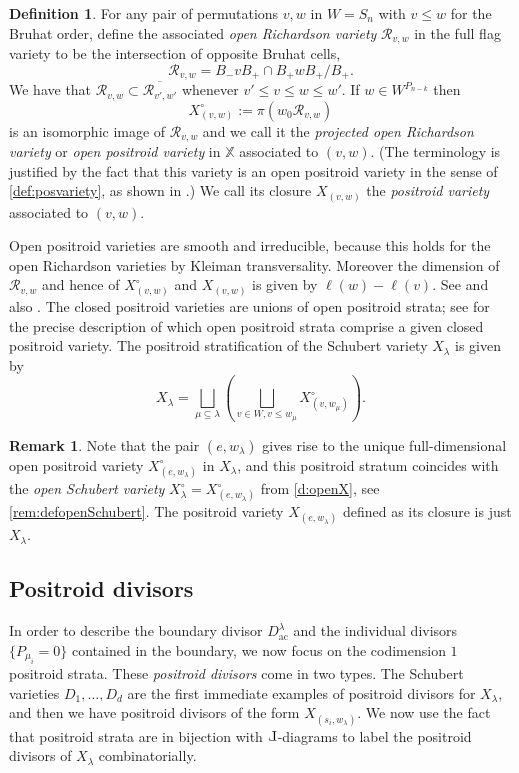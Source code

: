 \documentclass{amsart}
\def\Le{\hbox{\rotatebox[origin=c]{180}{$\Gamma$}}}
\theoremstyle{definition}
\newtheorem{defn}[thm]{Definition}
\newtheorem{remark}[thm]{Remark}
\numberwithin{equation}{section}
\newcommand{\openSchub}{{X_{\lambda}^{\circ}}}
\newcommand{\ac}{\operatorname{ac}}
\begin{document}
\begin{defn} \label{d:projRich} 
	For any pair of permutations $v,w$ in $W=S_n$ with $v\le w$ for the Bruhat order, define the associated \emph{open Richardson variety} $\mathcal R_{v,w}$ in the full flag variety to be the intersection of opposite Bruhat cells, 
$$
\mathcal R_{v,w}=B_-vB_+\cap B_+wB_+/B_+.
$$
We have that 
$\mathcal R_{v,w}\subset \overline{\mathcal R_{v',w'}}$ 
whenever $v'\le v\le w\le w'$.
If $w\in W^{P_{n-k}}$ then 
\[X^\circ_{(v,w)}:=\pi(w_0 \mathcal  R_{v,w})
\] 
is an isomorphic image of $\mathcal R_{v,w}$ and we call it the 
	\emph{projected open Richardson variety}   or \emph{open positroid variety}
	in $\mathbb X$ associated to $(v,w)$.  
	(The terminology is justified by the fact that this variety is an open positroid variety
	in the sense of \cref{def:posvariety}, as shown in 
	 \cite[Theorem 5.9]{KLS}.)
	We call its closure $X_{(v,w)}$ the \textit{positroid variety} associated to $(v,w)$.  
\end{defn}

Open positroid varieties are smooth and irreducible, because this holds for the open Richardson
varieties by Kleiman transversality. Moreover the dimension of $\mathcal R_{v,w}$ and hence of $X^\circ_{(v,w)}$ and $X_{(v,w)}$ is given by $\ell(w)-\ell(v)$. See \cite{KL} and also \cite{KLS}. The closed positroid varieties are unions of open positroid strata; see \cite{RietschClosure}
for the precise description of which open positroid strata
comprise a given closed positroid variety.
The positroid stratification of the Schubert variety $X_\lambda$ is given by
\begin{equation}\label{e:PositroidStrat}
X_\lambda=\bigsqcup_{\mu\subseteq \lambda}\left(\bigsqcup_{v\in W, v\le w_{\mu}} X^\circ_{(v,w_\mu)}\right).
\end{equation}


\begin{remark}\label{r:maximalpositroid}
Note that the pair $(e,w_\lambda)$ gives rise to the unique full-dimensional open  positroid variety $X^\circ_{(e,w_\lambda)}$ in $X_\lambda$, and this positroid stratum coincides with the  \emph{open Schubert variety} $\openSchub = 
X^\circ_{(e,w_\lambda)}$ 
from \cref{d:openX}, see \cref{rem:defopenSchubert}.
	The positroid variety $X_{(e,w_\lambda)}$ defined as its closure is just  $X_{\lambda}$.
\end{remark}

\subsection{Positroid divisors} 
In order to describe the boundary divisor $D^{\lambda}_{\ac}$ and the individual divisors $\{P_{\mu_i}=0\}$ contained in the boundary, we now focus on the codimension $1$ positroid strata.   These \textit{positroid divisors} come in two types. The Schubert varieties $D_1,\dots, D_d$ are the first immediate examples of positroid divisors for $X_\lambda$, and then we have positroid divisors of the form $X_{(s_i,w_\lambda)}$. We now use the fact that positroid strata are in bijection with $\Le$-diagrams to label the positroid divisors of $X_\lambda$ combinatorially. 
\end{document}
